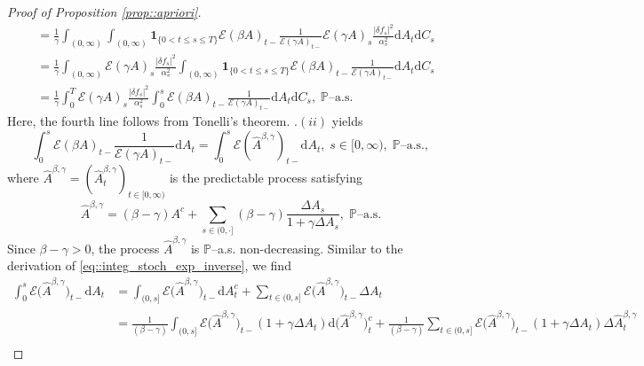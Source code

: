 \documentclass[10pt]{article} %
\newcommand\cE{\mathcal E}
\def \P{\mathbb{P}}
\newcommand{\1}{\mathbf{1}}
\def\d{\mathrm{d}}
\begin{document}
\begin{proof}[Proof of Proposition \ref{prop::apriori}]
\begin{align}
	&= \frac{1}{\gamma}\int_{(0,\infty)}\int_{(0,\infty)}\mathbf{1}_{\{0<t\leq s \leq T\}} \cE(\beta A)_{t-}  \frac{1}{\cE(\gamma A)_{t-}} \cE(\gamma A)_s \frac{|\delta f_s|^2}{\alpha^2_s} \d A_t \d C_s \nonumber\\
	&= \frac{1}{\gamma}\int_{(0,\infty)} \cE(\gamma A)_s \frac{|\delta f_s|^2}{\alpha^2_s} \int_{(0,\infty)}\mathbf{1}_{\{0<t\leq s \leq T\}} \cE(\beta A)_{t-}  \frac{1}{\cE(\gamma A)_{t-}} \d A_t \d C_s \nonumber\\
	&= \frac{1}{\gamma}\int_0^T \cE(\gamma A)_s \frac{|\delta f_s|^2}{\alpha^2_s} \int_0^s \cE(\beta A)_{t-}  \frac{1}{\cE(\gamma A)_{t-}} \d A_t \d C_s, \; \text{$\P$--a.s.}
\end{align}
Here, the fourth line follows from Tonelli's theorem. .$(ii)$ yields
\begin{equation*}
	\int_0^s \cE(\beta A)_{t-}  \frac{1}{\cE(\gamma A)_{t-}} \d A_t  = \int_0^s \cE(\widehat A^{\beta,\gamma})_{t-} \d A_t,\; s \in [0,\infty), \; \text{$\P$--a.s.},
\end{equation*}
where $\widehat A^{\beta,\gamma} = (\widehat A^{\beta,\gamma}_t)_{t \in [0,\infty)}$ is the predictable process satisfying
\begin{equation}\label{eq::widehat_A_beta_gamma}
	\widehat A^{\beta,\gamma} = (\beta-\gamma)A^c + \sum_{s \in (0,\cdot]} (\beta-\gamma)\frac{\Delta A_s}{1+\gamma\Delta A_s}, \; \text{$\P$--a.s.}
\end{equation}
Since $\beta-\gamma > 0$, the process $\widehat A^{\beta,\gamma}$ is $\P$--a.s. non-decreasing. Similar to the derivation of \eqref{eq::integ_stoch_exp_inverse}, we find
\begin{align}\label{eq::widehat_A_integral}
	\int_0^s \cE\big(\widehat A^{\beta,\gamma}\big)_{t-} \d A_t &= \int_{(0,s]} \cE\big(\widehat A^{\beta,\gamma}\big)_{t-} \d A^c_t + \sum_{t \in (0,s]} \cE\big(\widehat A^{\beta,\gamma}\big)_{t-} \Delta A_t \nonumber\\
	&= \frac{1}{(\beta-\gamma)}\int_{(0,s]} \cE\big(\widehat A^{\beta,\gamma}\big)_{t-} (1+\gamma\Delta A_t) \d \big(\widehat A^{\beta,\gamma}\big)^c_t + \frac{1}{(\beta-\gamma)}\sum_{t \in (0,s]} \cE\big(\widehat A^{\beta,\gamma}\big)_{t-} (1+\gamma\Delta A_t) \Delta \widehat A^{\beta,\gamma}_t \nonumber\\

\end{align}
\end{proof}
\end{document}
